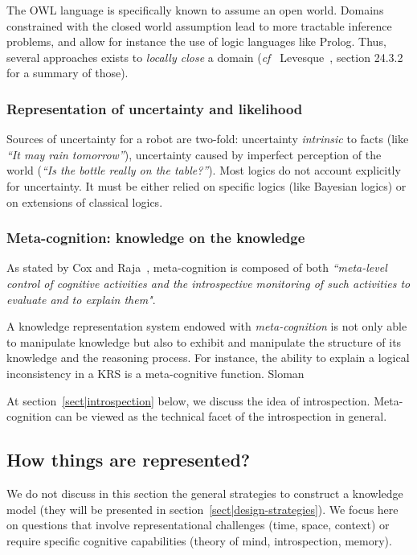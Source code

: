 \documentclass[a4paper, twocolumn]{article}
\newcommand{\cf}{{\textit{cf~}}}
\begin{document}
The OWL language is specifically known to assume an open world.  Domains
constrained with the closed world assumption lead to more tractable inference
problems, and allow for instance the use of logic languages like Prolog. Thus,
several approaches exists to \emph{locally close} a domain (\cf
Levesque~\cite{Levesque2008}, section 24.3.2 for a summary of those).

\subsubsection{Representation of uncertainty and likelihood}

Sources of uncertainty for a robot are two-fold: uncertainty \emph{intrinsic}
to facts (like \emph{``It may rain tomorrow''}), uncertainty caused by
imperfect perception of the world (\emph{``Is the bottle really on the
table?''}). Most logics do not account explicitly for uncertainty. It must be
either relied on specific logics (like Bayesian logics) or on extensions of
classical logics.

\subsubsection{Meta-cognition: knowledge on the knowledge}

As stated by Cox and Raja~\cite{Cox2007}, meta-cognition is composed of both
\emph{``meta-level control of cognitive activities and the introspective
monitoring of such activities to evaluate and to explain them"}.

A knowledge representation system endowed with \emph{meta-cognition} is not
only able to manipulate knowledge but also to exhibit and manipulate the
structure of its knowledge and the reasoning process. For instance, the ability
to explain a logical inconsistency in a KRS is a meta-cognitive function.
Sloman~\cite{Sloman2011} 

At section~\ref{sect|introspection} below, we discuss the idea of
introspection.  Meta-cognition can be viewed as the technical facet of the
introspection in general.


\subsection{How things are represented?}
\label{sect|higher-level-domain-representation}

We do not discuss in this section the general strategies to construct a
knowledge model (they will be presented in
section~\ref{sect|design-strategies}). We focus here on questions that involve
representational challenges (time, space, context) or require specific
cognitive capabilities (theory of mind, introspection, memory).
\end{document}
